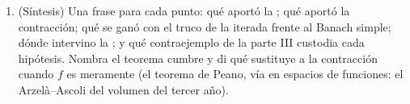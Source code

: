 \begin{problem}
\begin{enumerate}[resume]
        un segmento $\intcc{A}{B}$, adapta la pregunta 8 para
        probar que la cota factorial vale sobre el segmento
        \emph{entero}, de modo que allí la existencia y la unicidad
        son globales: el caso escalar del teorema de
        Cauchy--Lipschitz del~\cref{ch:b2:diffeq}, sin restricción
        alguna sobre la longitud $B - A$.
  \item (Síntesis) Una frase para cada punto: qué aportó la
        ; qué aportó la contracción; qué se ganó con el
        truco de la iterada frente al Banach simple; dónde
        intervino la ; y qué contraejemplo de la parte III
        custodia cada hipótesis. Nombra el teorema cumbre y di qué
        sustituye a la contracción cuando $f$ es meramente
         (el teorema de Peano, vía  en espacios de
        funciones: el Arzelà--Ascoli del volumen del tercer año).
\end{enumerate}
\end{problem}
